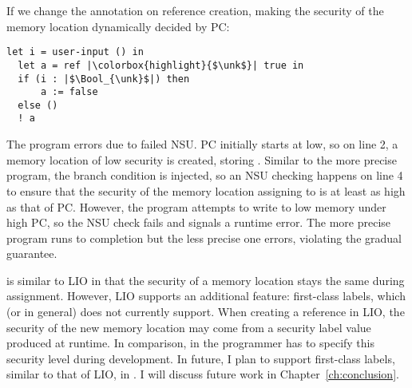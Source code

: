 If we change the annotation on reference creation, making the security of the
memory location dynamically decided by PC:

\noindent
{}
\begin{lstlisting}[style=tt,basicstyle=\ttfamily\footnotesize]
  let i = user-input () in
  let a = ref |\colorbox{highlight}{$\unk$}| true in
  if (i : |$\Bool_{\unk}$|) then
      a := false
  else ()
  ! a
\end{lstlisting}

\noindent The  program errors due to failed NSU. PC
initially starts at low, so on line 2, a memory location of low security is
created, storing \true. Similar to the more precise program, the branch
condition is injected, so an NSU checking happens on line 4 to ensure that the
security of the memory location assigning to is at least as high as that of PC.
However, the program attempts to write to low memory under high PC, so the NSU
check fails and signals a runtime error. The more precise program runs to
completion but the less precise one errors, violating the gradual guarantee.

\DynIFC is similar to LIO in that the security of a memory location stays the
same during assignment. However, LIO supports an additional feature: first-class
labels, which \DynIFC (or \Surface in general) does not currently support. When
creating a reference in LIO, the security of the new memory location may come
from a security label value produced at runtime. In comparison, in \Surface the
programmer has to specify this security level during development. In future, I
plan to support first-class labels, similar to that of LIO, in \Surface. I will
discuss future work in Chapter~\ref{ch:conclusion}.
